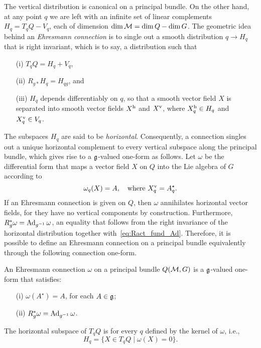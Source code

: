 \documentclass[
final,
11pt,
a4paper,
DIV=11,
headinclude=true,
footinclude=false,
bibliography=totoc,
twoside=true,  %
BCOR=5mm
]{scrbook}
\begin{document}
The vertical distribution is canonical on a principal bundle. On 
the other hand, at any point $q$ we are left with an infinite set 
of linear complements $H_q = T_q Q - V_q$, each of dimension 
$\dim\mathcal{M} = \dim Q - \dim G$. The geometric idea behind an 
\emph{Ehresmann connection} is to single out a smooth 
distribution $q \to H_q$ that is right invariant, which is to 
say, a distribution such that~\cite{ehresmann:1950}
\begin{itemize}
  \item[(i)] $T_q Q = H_q + V_q$,
  \item[(ii)] $R_{g*} H_q = H_{qg}$, and
  \item[(iii)] $H_q$ depends differentiably on $q$, so that a 
    smooth vector field $X$ is separated into smooth vector 
    fields $X^\mathrm{h}$ and $X^\mathrm{v}$, where $X^\mathrm{h}_q \in 
    H_q$ and $X^\mathrm{v}_q \in V_q$.
\end{itemize}
The subspaces $H_q$ are said to be \emph{horizontal}.  
Consequently, a connection singles out a unique horizontal 
complement to every vertical subspace along the principal bundle, 
which gives rise to a $\mathfrak{g}$-valued one-form as follows. Let 
$\omega$ be the differential form that maps a vector field $X$ on 
$Q$ into the Lie algebra of $G$ according to
\begin{equation*}
  \omega_q (X) = A,
  \quad\text{where}~X^\mathrm{v}_q = A^\star_q.
\end{equation*}
If an Ehresmann connection is given on $Q$, then $\omega$ 
annihilates horizontal vector fields, for they have no vertical 
components by construction. Furthermore, $R_g^*\omega = 
\operatorname{Ad}_{g^{-1}}\omega$, an equality that follows from the right 
invariance of the horizontal distribution together 
with~\eqref{eq:Ract_fund_Ad}. Therefore, it is possible to define 
an Ehresmann connection on a principal bundle equivalently 
through the following connection one-form.
\begin{definition}
An Ehresmann connection $\omega$ on a principal bundle 
$Q(\mathcal{M},G)$ is a $\mathfrak{g}$-valued one-form that satisfies:
\begin{itemize}
  \item[(i)] $\omega(A^\star) = A$, for each $A \in \mathfrak{g}$;
  \item[(ii)] $R_g^*\omega = \operatorname{Ad}_{g^{-1}}\omega$.
\end{itemize}
The horizontal subspace of $T_q Q$ is for every $q$ defined by 
the kernel of $\omega$, i.e.,
\begin{equation*}
  H_q = \{ X \in T_q Q \mid \omega(X) = 0 \}.
\end{equation*}
\end{definition}
\end{document}
